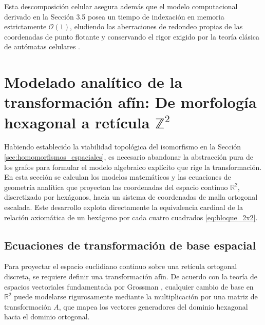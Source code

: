 Esta descomposición celular asegura además que el modelo computacional derivado en la Sección 3.5 posea un tiempo de indexación en memoria estrictamente $\mathcal{O}(1)$, eludiendo las aberraciones de redondeo propias de las coordenadas de punto flotante y conservando el rigor exigido por la teoría clásica de autómatas celulares \cite{Kari2005}.



\section{Modelado analítico de la transformación afín: De morfología hexagonal a retícula $\mathbb{Z}^2$}
\label{sec:transformacion_afin}

Habiendo establecido la viabilidad topológica del isomorfismo en la Sección \ref{sec:homomorfismos_espaciales}, es necesario abandonar la abstracción pura de los grafos para formular el modelo algebraico explícito que rige la transformación. En esta sección se calculan los modelos matemáticos y las ecuaciones de geometría analítica que proyectan las coordenadas del espacio continuo $\mathbb{R}^2$, discretizado por hexágonos, hacia un sistema de coordenadas de malla ortogonal escalada. Este desarrollo explota directamente la equivalencia cardinal de la relación axiomática de un hexágono por cada cuatro cuadrados \eqref{eq:bloque_2x2}.

\subsection{Ecuaciones de transformación de base espacial}
\label{subsec:ecuaciones_transformacion}

Para proyectar el espacio euclidiano continuo sobre una retícula ortogonal discreta, se requiere definir una transformación afín. De acuerdo con la teoría de espacios vectoriales fundamentada por Grossman \cite{Grossman2012}, cualquier cambio de base en $\mathbb{R}^2$ puede modelarse rigurosamente mediante la multiplicación por una matriz de transformación $A$, que mapea los vectores generadores del dominio hexagonal hacia el dominio ortogonal.

